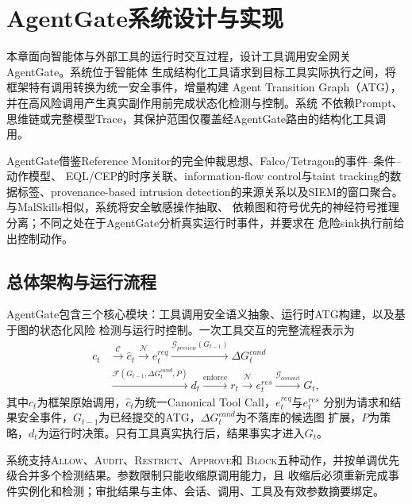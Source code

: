 \section{AgentGate系统设计与实现}
\label{sec:methodology}

本章面向智能体与外部工具的运行时交互过程，设计工具调用安全网关AgentGate。系统位于智能体
生成结构化工具请求到目标工具实际执行之间，将框架特有调用转换为统一安全事件，增量构建
Agent Transition Graph（ATG），并在高风险调用产生真实副作用前完成状态化检测与控制。系统
不依赖Prompt、思维链或完整模型Trace，其保护范围仅覆盖经AgentGate路由的结构化工具调用。

AgentGate借鉴Reference Monitor的完全仲裁思想、Falco/Tetragon的事件--条件--动作模型、
EQL/CEP的时序关联、information-flow control与taint tracking的数据标签、provenance-based
intrusion detection的来源关系以及SIEM的窗口聚合。与MalSkills相似，系统将安全敏感操作抽取、
依赖图和符号优先的神经符号推理分离；不同之处在于AgentGate分析真实运行时事件，并要求在
危险sink执行前给出控制动作。

\subsection{总体架构与运行流程}
\label{subsec:architecture}

AgentGate包含三个核心模块：工具调用安全语义抽象、运行时ATG构建，以及基于图的状态化风险
检测与运行时控制。一次工具交互的完整流程表示为
\begin{equation}
\begin{aligned}
c_t &\xrightarrow{\mathcal{C}} \hat{c}_t
\xrightarrow{\mathcal{N}} e_t^{req}
\xrightarrow{\mathcal{G}_{preview}(G_{t-1})} \Delta G_t^{cand}\\
&\xrightarrow{\mathcal{F}(G_{t-1},\Delta G_t^{cand},P)} d_t
\xrightarrow{\mathrm{enforce}} r_t
\xrightarrow{\mathcal{N}} e_t^{res}
\xrightarrow{\mathcal{G}_{commit}} G_t,
\end{aligned}
\label{eq:atg-runtime}
\end{equation}
其中$c_t$为框架原始调用，$\hat{c}_t$为统一Canonical Tool Call，$e_t^{req}$与$e_t^{res}$
分别为请求和结果安全事件，$G_{t-1}$为已经提交的ATG，$\Delta G_t^{cand}$为不落库的候选图
扩展，$P$为策略，$d_t$为运行时决策。只有工具真实执行后，结果事实才进入$G_t$。

系统支持\textsc{Allow}、\textsc{Audit}、\textsc{Restrict}、\textsc{Approve}和
\textsc{Block}五种动作，并按单调优先级合并多个检测结果。参数限制只能收缩原调用能力，且
收缩后必须重新完成事件实例化和检测；审批结果与主体、会话、调用、工具及有效参数摘要绑定。

